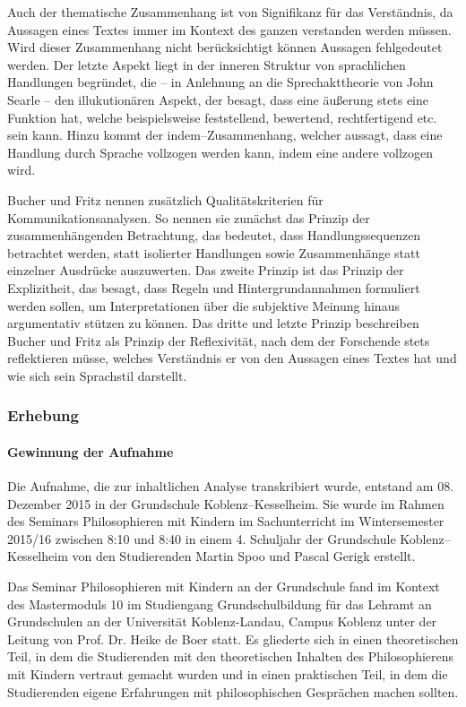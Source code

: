 Auch der thematische Zusammenhang ist von Signifikanz für das Verständnis, da Aussagen eines Textes immer im Kontext des ganzen verstanden werden müssen. 
Wird dieser Zusammenhang nicht berücksichtigt können Aussagen fehlgedeutet werden. 
Der letzte Aspekt liegt in der inneren Struktur von sprachlichen Handlungen begründet, die -- in Anlehnung an die Sprechakttheorie von John Searle -- den illukutionären Aspekt, der besagt, dass eine äußerung stets eine Funktion hat, welche beispielsweise feststellend, bewertend, rechtfertigend etc. sein kann. 
Hinzu kommt der indem--Zusammenhang, welcher aussagt, dass eine Handlung durch Sprache vollzogen werden kann, indem eine andere vollzogen wird\cite[S.\, 137f]{HB80}.

Bucher und Fritz nennen zusätzlich Qualitätskriterien für Kommunikationsanalysen. 
So nennen sie zunächst das Prinzip der zusammenhängenden Betrachtung, das bedeutet, dass Handlungssequenzen betrachtet werden, statt isolierter Handlungen sowie Zusammenhänge statt einzelner Ausdrücke auszuwerten\cite[S.\,137f]{HB80}.
 Das zweite Prinzip ist das Prinzip der Explizitheit, das besagt, dass Regeln und Hintergrundannahmen formuliert werden sollen, um Interpretationen über die subjektive Meinung hinaus argumentativ stützen zu können. 
 Das dritte und letzte Prinzip beschreiben Bucher und Fritz als Prinzip der Reflexivität, nach dem der Forschende stets reflektieren müsse, welches Verständnis er von den Aussagen eines Textes hat und wie sich sein Sprachstil darstellt\cite[S.\,143]{HB80}.
 
 \newpage
 
 
\subsubsection{Erhebung}

\paragraph{Gewinnung der Aufnahme}

Die Aufnahme, die zur inhaltlichen Analyse transkribiert wurde, entstand am 08. Dezember 2015 in der Grundschule Koblenz--Kesselheim. 
Sie wurde im Rahmen des Seminars \glqq Philosophieren mit Kindern im Sachunterricht\grqq{} im Wintersemester 2015/16 zwischen 8:10 und 8:40 in einem 4. Schuljahr der Grundschule Koblenz--Kesselheim von den Studierenden Martin Spoo und Pascal Gerigk erstellt. 

Das Seminar \glqq Philosophieren mit Kindern an der Grundschule\grqq{} fand im Kontext des Mastermoduls 10 im Studiengang Grundschulbildung für das Lehramt an Grundschulen an der Universität Koblenz-Landau, Campus Koblenz unter der Leitung von Prof. Dr. Heike de Boer statt. 
Es gliederte sich in einen theoretischen Teil, in dem die Studierenden mit den theoretischen Inhalten des Philosophierens mit Kindern vertraut gemacht wurden und in einen praktischen Teil, in dem die Studierenden eigene Erfahrungen mit philosophischen Gesprächen machen sollten.

